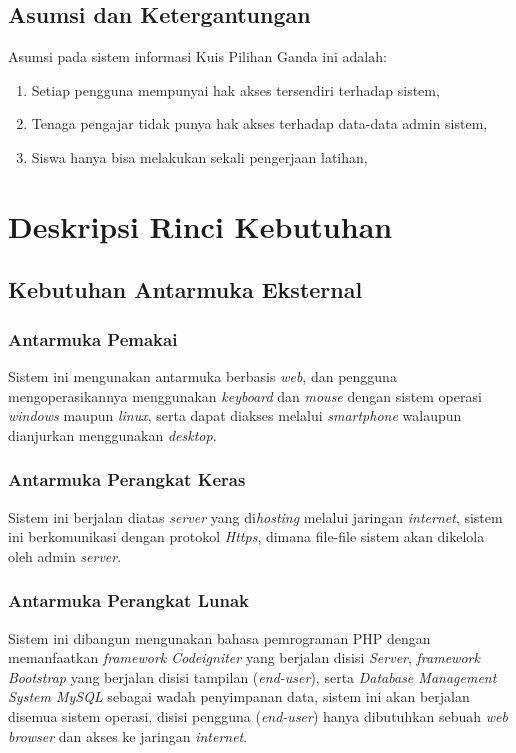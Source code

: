 \documentclass{scrreprt}
\begin{document}
\section{Asumsi dan Ketergantungan}
Asumsi pada sistem informasi Kuis Pilihan Ganda ini adalah:
\begin{enumerate}
	\item Setiap pengguna mempunyai hak akses tersendiri terhadap sistem,
	\item Tenaga pengajar tidak punya hak akses terhadap data-data admin sistem,
	\item Siswa hanya bisa melakukan sekali pengerjaan latihan,
\end{enumerate}



\chapter{Deskripsi Rinci Kebutuhan}

\section{Kebutuhan Antarmuka Eksternal}

	\subsection{Antarmuka Pemakai}
	
	Sistem ini mengunakan antarmuka berbasis \emph{web}, dan pengguna mengoperasikannya menggunakan \emph{keyboard} dan \emph{mouse} dengan sistem operasi \emph{windows} maupun \emph{linux}, serta dapat diakses melalui \emph{smartphone} walaupun dianjurkan menggunakan \emph{desktop}.
	\subsection{Antarmuka Perangkat Keras}
	Sistem ini berjalan diatas \emph{server} yang di\emph{hosting} melalui jaringan \emph{internet}, sistem ini berkomunikasi dengan protokol \emph{Https}, dimana file-file sistem akan dikelola oleh admin \emph{server}.
	\subsection{Antarmuka Perangkat Lunak}
	Sistem ini dibangun mengunakan bahasa pemrograman PHP dengan memanfaatkan \emph{framework Codeigniter} yang berjalan disisi \emph{Server}, \emph{framework Bootstrap} yang berjalan disisi tampilan (\emph{end-user}), serta \emph{Database Management System MySQL} sebagai wadah penyimpanan data, sistem ini akan berjalan disemua sistem operasi, disisi pengguna (\emph{end-user}) hanya dibutuhkan sebuah \emph{web browser} dan akses ke jaringan \emph{internet}. 
	
\end{document}
